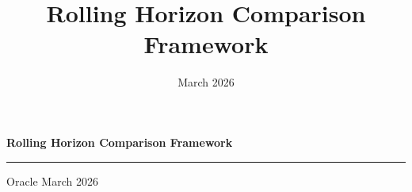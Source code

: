 \documentclass[aspectratio=169,10pt]{beamer}
\title{Rolling Horizon Comparison Framework}
\institute{Oracle}
\date{March 2026}
\begin{document}
\begin{frame}[plain]
  \vspace{1.6cm}
  \begin{center}
    {\color{pblue}\fontsize{24}{28}\selectfont\bfseries
      Rolling Horizon Comparison Framework}
    \par\vspace{10pt}
    \textcolor{pblue!25}{\rule{8cm}{0.6pt}}
    \par\vspace{14pt}
    {\color{mgray}\small
      Oracle \;\textbullet{} March 2026}
  \end{center}
\end{frame}
\end{document}

